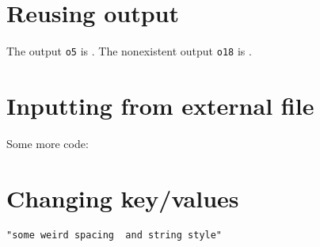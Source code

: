 \documentclass[12pt,a4paper]{amsart}
\begin{document}
\section{Reusing output}
The output {\tt o5} is .
The nonexistent output {\tt o18} is .

\section{Inputting from external file}
Some more code:


\section{Changing key/values}
\begin{lstlisting}[showstringspaces=true,language=Macaulay2,basewidth={1.5ex}]
"some weird spacing  and string style"
\end{lstlisting}
\end{document}
